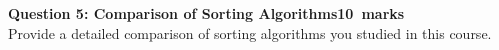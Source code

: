 \documentclass[12pt,a4paper]{article}
\def\Qfive{10}
\begin{document}
%
%		
\newpage
\noindent\textbf{Question 5: Comparison of Sorting Algorithms\hfill \Qfive~marks}\\
Provide a detailed comparison of sorting algorithms you studied in this course.
\end{document}
